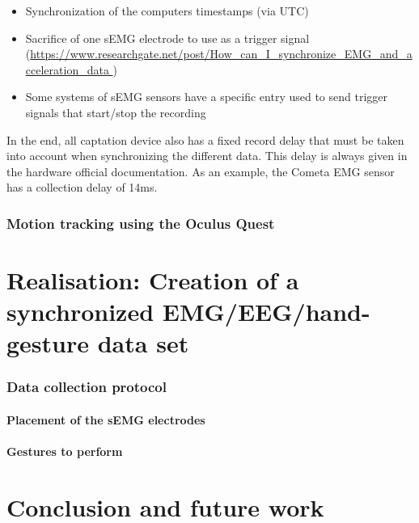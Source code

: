 \documentclass[12pt]{article}
\begin{document}
	\begin{itemize}
		\item Synchronization of the computers timestamps (via UTC)
		\item Sacrifice of one sEMG electrode to use as a trigger signal (\url{https://www.researchgate.net/post/How\_can\_I\_synchronize\_EMG\_and\_acceleration\_data })
		\item Some systems of sEMG sensors have a specific entry used to send trigger signals that start/stop the recording
	\end{itemize}

	In the end, all captation device also has a fixed record delay that must be taken into account when synchronizing the different data. This delay is always given in the hardware official documentation. As an example, the Cometa EMG sensor has a collection delay of 14ms.
	
	
	
	
	\section{Motion tracking using the Oculus Quest}
	
	
	
	
	
	\newpage
	\part{Realisation: Creation of a synchronized EMG/EEG/hand-gesture data set}
	
	
	
	
	
	
	\section{Data collection protocol}
	
	\subsection{Placement of the sEMG electrodes}
	
	\subsection{Gestures to perform}
	
	
	\newpage
	\part{Conclusion and future work}
	
	\newpage
	
	
	\nocite{*}
	
	
\end{document}
